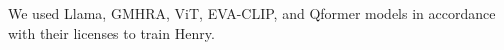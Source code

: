 We used Llama, GMHRA, ViT, EVA-CLIP, and Qformer models in accordance with their licenses to train Henry.  


